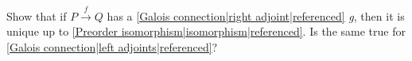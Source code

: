 

Show that if $P \xrightarrow{f}Q$ has a \ref{Galois connection|right adjoint|referenced} \emph{g}, then it is unique up to \ref{Preorder isomorphism|isomorphism|referenced}.  Is the same true for \ref{Galois connection|left adjoints|referenced}?